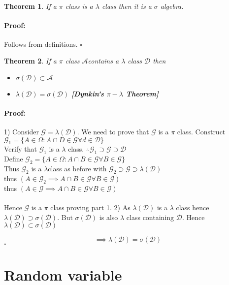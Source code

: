 \documentclass{article}
\newenvironment{proof}{\paragraph{Proof:}}{\hfill$\square$}
\newtheorem{theorem}{Theorem}[section]
\begin{document}
\begin{theorem}
    If a $\pi$ class is a $\lambda $ class then it is a $\sigma$ algebra.
 
\end{theorem}
\begin{proof}
    Follows from definitions.
\end{proof}
\begin{theorem}
    If a $\pi $ class $\mathcal{A} $contains a $\lambda$ class $\mathcal{D} $ then 
\begin{itemize}
    \item $\sigma(\mathcal{D} ) \subset \mathcal{A} $
    \item $\lambda(\mathcal{D} ) = \sigma(\mathcal{D} )$ \textbf{[Dynkin's $\pi - \lambda $ Theorem]}
\end{itemize}
\end{theorem}
\begin{proof}
    1) Consider $\mathcal{G} = \lambda(\mathcal{D} )$. We need to prove that $\mathcal{G}$ is a $\pi $ class.
    Construct $\mathcal{G}_1 = \{ A \in \Omega : A \cap D \in \mathcal{G} \forall d \in \mathcal{D}  \}$ 
    \\ Verify that $\mathcal{G}_1 $ is a $\lambda $ class. $\therefore \mathcal{G}_1 \supset \mathcal{G} \supset \mathcal{D}$\\
    Define  $\mathcal{G}_2 = \{ A \in \Omega : A \cap B \in \mathcal{G} \forall B \in \mathcal{G}  \}$ 
\\Thus  $\mathcal{G}_2$ is a $\lambda $class as before with $\mathcal{G}_2 \supset \mathcal{G} \supset \lambda(\mathcal{D})$
\\ thus $( A \in \mathcal{G}_2 \implies A\cap B \in \mathcal{G}  \forall B \in \mathcal{G}  )$
\\ thus $( A \in \mathcal{G} \implies A\cap B \in \mathcal{G}  \forall B \in \mathcal{G}    )$
\\ \\ Hence $\mathcal{G} $ is a $\pi $ class proving part 1.
 2) As $\lambda(\mathcal{D} )$ is a $\lambda $ class hence $\lambda(\mathcal{D} ) \supset \sigma(\mathcal{D} )$. But $\sigma(\mathcal{D} )  $ is also $\lambda $ class containing $\mathcal{D} $. Hence $\lambda(\mathcal{D} ) \subset \sigma(\mathcal{D} )$ 
 
 $$\implies \lambda(\mathcal{D} ) = \sigma(\mathcal{D} )$$
\end{proof}
\section{Random variable}
\end{document}
